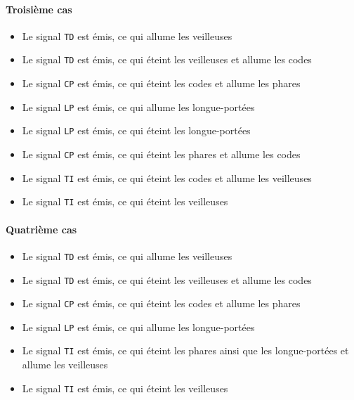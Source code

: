 \documentclass{article}
\begin{document}
      \paragraph{Troisième cas}
        \begin{itemize}
          \item Le signal {\tt TD} est émis, ce qui allume les veilleuses
          \item Le signal {\tt TD} est émis, ce qui éteint les veilleuses et
            allume les codes
          \item Le signal {\tt CP} est émis, ce qui éteint les codes et allume
            les phares 
          \item Le signal {\tt LP} est émis, ce qui allume les longue-portées
          \item Le signal {\tt LP} est émis, ce qui éteint les longue-portées
          \item Le signal {\tt CP} est émis, ce qui éteint les phares et allume
            les codes 
          \item Le signal {\tt TI} est émis, ce qui éteint les codes et allume
            les veilleuses
          \item Le signal {\tt TI} est émis, ce qui éteint les veilleuses
        \end{itemize}

      \paragraph{Quatrième cas}
        \begin{itemize}
          \item Le signal {\tt TD} est émis, ce qui allume les veilleuses
          \item Le signal {\tt TD} est émis, ce qui éteint les veilleuses et
            allume les codes
          \item Le signal {\tt CP} est émis, ce qui éteint les codes et allume
            les phares 
          \item Le signal {\tt LP} est émis, ce qui allume les longue-portées
          \item Le signal {\tt TI} est émis, ce qui éteint les phares ainsi que
            les longue-portées et allume les veilleuses
          \item Le signal {\tt TI} est émis, ce qui éteint les veilleuses
        \end{itemize} \medskip
\end{document}
